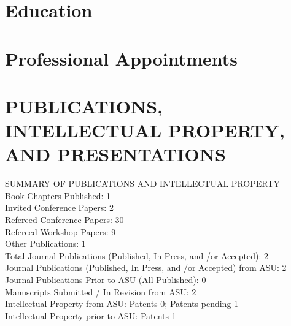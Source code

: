 \documentclass[11pt,letterpaper,sans]{moderncv}
\begin{document}
\makecvtitle

\section{Education}

\section{Professional Appointments}




\section{PUBLICATIONS, INTELLECTUAL PROPERTY, AND PRESENTATIONS}

\begin{framed}
\underline{SUMMARY OF PUBLICATIONS AND INTELLECTUAL PROPERTY} \\
Book Chapters Published: 1 \\
Invited Conference Papers: 2 \\
Refereed Conference Papers: 30 \\
Refereed Workshop Papers: 9 \\
Other Publications: 1 \\
Total Journal Publications (Published, In Press, and /or Accepted): 2 \\
Journal Publications (Published, In Press, and /or Accepted) from ASU: 2 \\
Journal Publications Prior to ASU (All Published): 0 \\
Manuscripts Submitted / In Revision from ASU: 2 \\
Intellectual Property from ASU:  Patents 0; Patents pending 1 \\
Intellectual Property prior to ASU:  Patents 1 \\
\end{framed}
\end{document}
